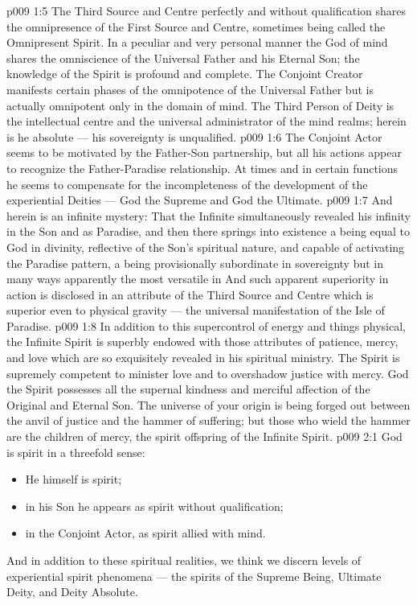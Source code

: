 \vs p009 1:5 \pc The Third Source and Centre perfectly and without qualification shares the omnipresence of the First Source and Centre, sometimes being called the Omnipresent Spirit. In a peculiar and very personal manner the God of mind shares the omniscience of the Universal Father and his Eternal Son; the knowledge of the Spirit is profound and complete. The Conjoint Creator manifests certain phases of the omnipotence of the Universal Father but is actually omnipotent only in the domain of mind. The Third Person of Deity is the intellectual centre and the universal administrator of the mind realms; herein is he absolute --- his sovereignty is unqualified.
\vs p009 1:6 The Conjoint Actor seems to be motivated by the Father\hyp{}Son partnership, but all his actions appear to recognize the Father\hyp{}Paradise relationship. At times and in certain functions he seems to compensate for the incompleteness of the development of the experiential Deities --- God the Supreme and God the Ultimate.
\vs p009 1:7 \pc And herein is an infinite mystery: That the Infinite simultaneously revealed his infinity in the Son and as Paradise, and then there springs into existence a being equal to God in divinity, reflective of the Son’s spiritual nature, and capable of activating the Paradise pattern, a being provisionally subordinate in sovereignty but in many ways apparently the most versatile in  And such apparent superiority in action is disclosed in an attribute of the Third Source and Centre which is superior even to physical gravity --- the universal manifestation of the Isle of Paradise.
\vs p009 1:8 In addition to this supercontrol of energy and things physical, the Infinite Spirit is superbly endowed with those attributes of patience, mercy, and love which are so exquisitely revealed in his spiritual ministry. The Spirit is supremely competent to minister love and to overshadow justice with mercy. God the Spirit possesses all the supernal kindness and merciful affection of the Original and Eternal Son. The universe of your origin is being forged out between the anvil of justice and the hammer of suffering; but those who wield the hammer are the children of mercy, the spirit offspring of the Infinite Spirit.
\vs p009 2:1 God is spirit in a threefold sense: \begin{itemize}\item He himself is spirit; \item in his Son he appears as spirit without qualification; \item in the Conjoint Actor, as spirit allied with mind.\end{itemize} And in addition to these spiritual realities, we think we discern levels of experiential spirit phenomena --- the spirits of the Supreme Being, Ultimate Deity, and Deity Absolute.
